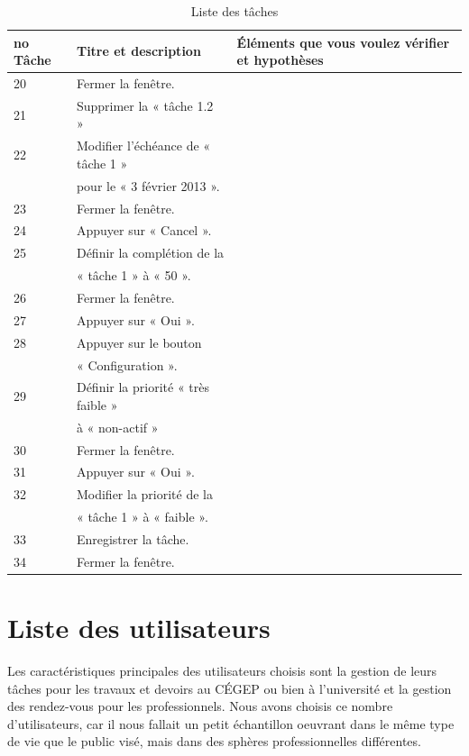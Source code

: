\documentclass[letterpaper, oneside, 12pt, these, creativecommons]{thETS}
\begin{document}
\begin{table}
	\centering
	\begin{tabular}{|l|l|l|}
		\hline
		no Tâche	& Titre et description		& Éléments que vous voulez vérifier et hypothèses 	\\ \hline 
		20		& Fermer la fenêtre.		&								\\ \hline
		21		& Supprimer la « tâche 1.2 »	&								\\ \hline
		22		& Modifier l’échéance de « tâche 1 »&								\\
				&  pour le « 3 février 2013 ».	&								\\ \hline
		23		& Fermer la fenêtre.		&								\\ \hline
		24		& Appuyer sur « Cancel ».		&								\\ \hline
		25		& Définir la complétion de la 	&								\\
				& « tâche 1 » à « 50 ».		&								\\ \hline
		26		& Fermer la fenêtre.		&								\\ \hline
		27		& Appuyer sur « Oui ».		&								\\ \hline
		28		& Appuyer sur le bouton 		&								\\
				& « Configuration ».		&								\\ \hline
		29		& Définir la priorité « très faible » &								\\
				& à « non-actif »			&								\\ \hline
		30		& Fermer la fenêtre.		&								\\ \hline
		31		& Appuyer sur « Oui ».		&								\\ \hline
		32		& Modifier la priorité de la 		&								\\
				& « tâche 1 » à « faible ».		&								\\ \hline
		33		& Enregistrer la tâche.		&								\\ \hline
		34		& Fermer la fenêtre.		&								\\ \hline
	\end{tabular}
	\caption{Liste des tâches}
\end{table}

\section{Liste des utilisateurs}

Les caractéristiques principales des utilisateurs choisis sont la gestion de leurs tâches pour les travaux et devoirs au CÉGEP ou bien à l'université et la gestion des rendez-vous pour les professionnels. Nous avons choisis ce nombre d'utilisateurs, car il nous fallait un petit échantillon oeuvrant dans le même type de vie que le public visé, mais dans des sphères professionnelles différentes.
\end{document}

